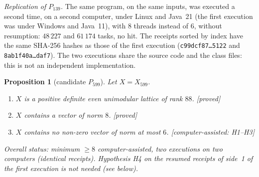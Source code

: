 \documentclass[11pt,a4paper]{amsart}
\theoremstyle{plain}
\newtheorem{proposition}[theorem]{Proposition}
\theoremstyle{definition}
\numberwithin{equation}{section}
\newcommand{\st}[1]{\textup{\textsf{\small[#1]}}}
\newcommand{\DEM}{\st{proved}}
\begin{document}
\emph{Replication of $P_{139}$.} The same program, on the same inputs, was executed a second time, on a second computer, under Linux and Java~21 (the first execution was under Windows and Java~11), with $8$ threads instead of $6$, without resumption: $48\,227$ and $61\,174$ tasks, no hit. The receipts sorted by index have the same SHA-256 hashes as those of the first execution (\texttt{c99dcf87\dots5122} and \texttt{8ab1f40a\dots daf7}). The two executions share the source code and the class files: this is not an independent implementation.

\begin{proposition}[candidate $P_{599}$]\label{prop:P599}
Let $X=X_{599}$.
\begin{enumerate}[label=\textup{(\arabic*)}]
\item $X$ is a positive definite even unimodular lattice of rank $88$. \DEM
\item $X$ contains a vector of norm $8$. \DEM
\item $X$ contains no non-zero vector of norm at most $6$. \st{computer-assisted: H1--H3}
\end{enumerate}
Overall status: minimum $\ge8$ computer-assisted, two executions on two computers (identical receipts). Hypothesis H4 on the resumed receipts of side~1 of the first execution is not needed (see below).
\end{proposition}
\end{document}
